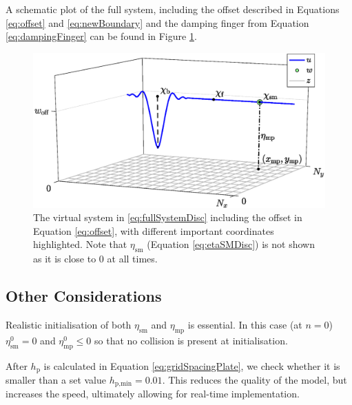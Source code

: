 \documentclass[dvipsnames, pdftex]{article}
\begin{document}
A schematic plot of the full system, including the offset described in Equations \eqref{eq:offset} and \eqref{eq:newBoundary} and the damping finger from Equation \eqref{eq:dampingFinger} can be found in Figure \ref{fig:trombaSystem}.

\begin{figure}[h]
  \centering
  \includegraphics[width=1.0\columnwidth]{trombaSystem.eps}
  \caption{The virtual system in \eqref{eq:fullSystemDisc} including the offset in Equation \eqref{eq:offset}, with different important coordinates highlighted. Note that $\eta_\text{sm}$ (Equation \eqref{eq:etaSMDisc}) is not shown as it is close to 0 at all times.}
  \label{fig:trombaSystem}
\end{figure}


\subsection{Other Considerations}
Realistic initialisation of both $\eta_\text{sm}$ and $\eta_\text{mp}$ is essential. In this case (at $n=0$) $\eta_\text{sm}^0 = 0$ and $\eta_\text{mp}^0 \leq 0$ so that no collision is present at initialisation.%

After $h_\text{p}$ is calculated in Equation \eqref{eq:gridSpacingPlate}, we check whether it is smaller than a set value $h_{\text{p},\text{min}} = 0.01$. This reduces the quality of the model, but increases the speed, ultimately allowing for real-time implementation.
\end{document}
